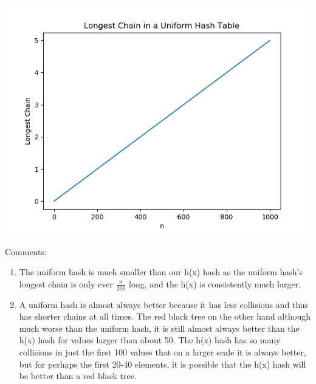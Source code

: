 \documentclass[12pt]{article}
\begin{document}
\begin{enumerate}
\begin{enumerate}
\begin{enumerate}
            \includegraphics[width=6in]{PS4FIG4.png}\newline
            \\
        \end{enumerate}
        Comments:\\
        \begin{enumerate}
            \item 
            
            The uniform hash is much smaller than our h(x) hash as the uniform hash's longest chain is only ever $\frac{n}{200}$ long, and the h(x) is consistently much larger.\\
            
            \item
            
            A uniform hash is almost always better because it has less collisions and thus has shorter chains at all times. The red black tree on the other hand although much worse than the uniform hash, it is still almost always better than the h(x) hash for values larger than about 50. The h(x) hash has so many collisions in just the first 100 values that on a larger scale it is always better, but for perhaps the first 20-40 elements, it is possible that the h(x) hash will be better than a red black tree.\\
            
        \end{enumerate}
        
    \end{enumerate}
    
    \newpage


\end{enumerate}
\end{document}
